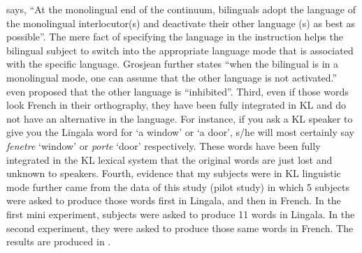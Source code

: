 \documentclass[output=paper]{langscibook}
\begin{document}
\citet[410]{grosjean2003processing} says, “At the monolingual end of the continuum, bilinguals adopt the language of the monolingual interlocutor(s) and deactivate their other language (s) as best as possible”. The mere fact of specifying the language in the instruction helps the bilingual subject to switch into the appropriate language mode that is associated with the specific language. Grosjean further states “when the bilingual is in a monolingual mode, one can assume that the other language is not activated.” \citet[412]{Green1986} even proposed that the other language is “inhibited”. Third, even if those words look French in their orthography, they have been fully integrated in KL and do not have an alternative in the language. For instance, if you ask a KL speaker to give you the Lingala word for `a window' or `a door', s/he will most certainly say \textit{fenetre} ‘window’ or \textit{porte} ‘door’ respectively. These words have been fully integrated in the KL lexical system that the original words are just lost and unknown to speakers. Fourth, evidence that my subjects were in KL linguistic mode further came from the data of this study (pilot study) in which 5 subjects were asked to produce those words first in Lingala, and then in French. In the first mini experiment, subjects were asked to produce 11 words in Lingala. In the second experiment, they were asked to produce those same words in French. The results are produced in .
\end{document}
